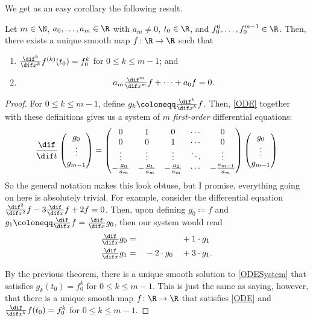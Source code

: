 We get as an easy corollary the following result.
\begin{crl}{}{}
Let $m\in \N$, $a_0,\ldots ,a_m\in \R$ with $a_m\neq 0$, $t_0\in \R$, and $f_0^0,\ldots ,f_0^{m-1}\in \R$.  Then, there exists a unique smooth map $f\colon \R \rightarrow \R$ such that
\begin{enumerate}
\item $\frac{\dif ^k}{\dif x^k}f^{(k)}(t_0)=f_0^k$ for $0\leq k\leq m-1$; and
\item
\begin{equation}\label{ODE}
a_m\tfrac{\dif ^m}{\dif x^m}f+\cdots +a_0f=0.
\end{equation}
\end{enumerate}
\begin{proof}
For $0\leq k\leq m-1$, define $g_k\coloneqq \frac{\dif ^k}{\dif x^k}f$.  Then, \eqref{ODE} together with these definitions gives us a system of $m$ \emph{first-order} differential equations:
\begin{equation}\label{ODESystem}
\frac{\dif}{\dif t}\begin{pmatrix}g_0 \\ \vdots \\ g_{m-1}\end{pmatrix}=\begin{pmatrix}0 & 1 & 0 & \cdots & 0 \\ 0 & 0 & 1 & \cdots & 0 \\ \vdots & \vdots & \vdots & \ddots & \vdots \\ -\tfrac{a_0}{a_m} & -\tfrac{a_1}{a_m} & -\tfrac{a_2}{a_m} & \cdots & -\tfrac{a_{m-1}}{a_m}\end{pmatrix}\begin{pmatrix}g_0 \\ \vdots \\ g_{m-1}\end{pmatrix}
\end{equation}
So the general notation makes this look obtuse, but I promise, everything going on here is absolutely trivial.  For example, consider the differential equation $\frac{\dif ^2}{\dif x^2}f-3\frac{\dif}{\dif x}f+2f=0$.  Then, upon defining $g_0\coloneqq f$ and $g_1\coloneqq \frac{\dif}{\dif x}f=\frac{\dif}{\dif x}g_0$, then our system would read
\begin{equation}
\begin{aligned}
\tfrac{\dif}{\dif x}g_0 & = & & & & +1\cdot g_1 \\
\tfrac{\dif}{\dif x}g_1 & = & &-2\cdot g_0 & & +3\cdot g_1.
\end{aligned}
\end{equation}

By the previous theorem, there is a unique smooth solution to \eqref{ODESystem} that satisfies $g_k(t_0)=f_0^k$ for $0\leq k\leq m-1$.  This is just the same as saying, however, that there is a unique smooth map $f\colon \R \rightarrow \R$ that satisfies \eqref{ODE} and $\frac{\dif}{\dif x^k}f(t_0)=f_0^k$ for $0\leq k\leq m-1$.
\end{proof}
\end{crl}

